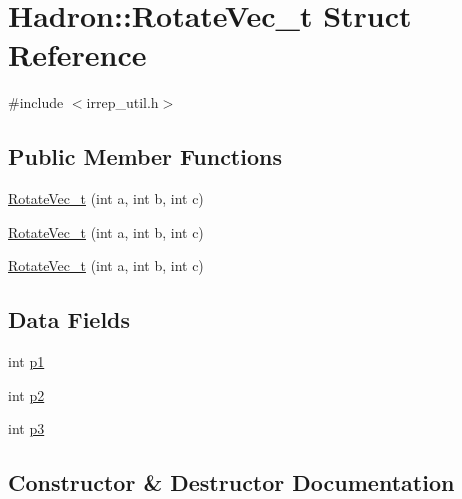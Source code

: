 \hypertarget{structHadron_1_1RotateVec__t}{}\section{Hadron\+:\+:Rotate\+Vec\+\_\+t Struct Reference}
\label{structHadron_1_1RotateVec__t}


{\ttfamily \#include $<$irrep\+\_\+util.\+h$>$}

\subsection*{Public Member Functions}
\begin{DoxyCompactItemize}
\item 
\mbox{\hyperlink{structHadron_1_1RotateVec__t_a137f265a3fb53776d2ee401044aab1fa}{Rotate\+Vec\+\_\+t}} (int a, int b, int c)
\item 
\mbox{\hyperlink{structHadron_1_1RotateVec__t_a137f265a3fb53776d2ee401044aab1fa}{Rotate\+Vec\+\_\+t}} (int a, int b, int c)
\item 
\mbox{\hyperlink{structHadron_1_1RotateVec__t_a137f265a3fb53776d2ee401044aab1fa}{Rotate\+Vec\+\_\+t}} (int a, int b, int c)
\end{DoxyCompactItemize}
\subsection*{Data Fields}
\begin{DoxyCompactItemize}
\item 
int \mbox{\hyperlink{structHadron_1_1RotateVec__t_aa01fc53854938079a4599536752b6121}{p1}}
\item 
int \mbox{\hyperlink{structHadron_1_1RotateVec__t_aaf71d154338bbf9c3775e8bce981febc}{p2}}
\item 
int \mbox{\hyperlink{structHadron_1_1RotateVec__t_aa3170eab6d36c15ae3f4e663e064a3e7}{p3}}
\end{DoxyCompactItemize}


\subsection{Constructor \& Destructor Documentation}
\mbox{\label{structHadron_1_1RotateVec__t_a137f265a3fb53776d2ee401044aab1fa}} 
